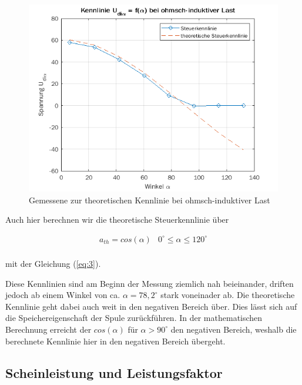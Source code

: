 \documentclass{article}
\begin{document}
\begin{figure}[h]
  \centering
  \includegraphics[width=\textwidth]{../assets/images/GEP2/udia_alpha_induk.png}
  \caption{Gemessene zur theoretischen Kennlinie bei ohmsch-induktiver Last}
  \label{fig:udiaalphainduk}
\end{figure}
Auch hier berechnen wir die theoretische Steuerkennlinie über

\begin{equation*}
  \label{eq:4}
  \begin{array}{ll}
    a_{th} = cos(\alpha) & 0^{\circ} \leq\alpha\leq 120^{\circ}\\
  \end{array}
\end{equation*}

mit der Gleichung (\ref{eq:3}).

Diese Kennlinien sind am Beginn der Messung ziemlich nah beieinander, driften jedoch ab einem Winkel von ca. $\alpha = 78,2^{\circ}$ stark voneinader ab. Die theoretische Kennlinie geht dabei auch weit in den negativen Bereich über. Dies lässt sich auf die Speichereigenschaft der Spule zurückführen. In der mathematischen Berechnung erreicht der $cos(\alpha)$ für $\alpha > 90^{\circ}$ den negativen Bereich, weshalb die berechnete Kennlinie hier in den negativen Bereich übergeht.

\subsection{Scheinleistung und Leistungsfaktor}
\label{sec:sche-und-leist}
\end{document}
